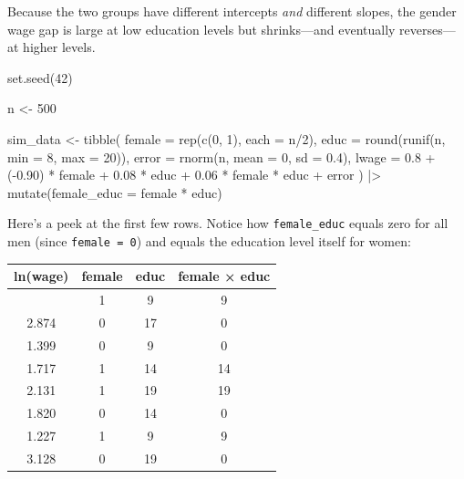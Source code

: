 \documentclass[
  letterpaper,
  DIV=11,
  numbers=noendperiod]{scrreprt}
\newenvironment{Shaded}{\begin{snugshade}}{\end{snugshade}}
\newcommand{\AttributeTok}[1]{\textcolor[rgb]{0.40,0.45,0.13}{#1}}
\newcommand{\DecValTok}[1]{\textcolor[rgb]{0.68,0.00,0.00}{#1}}
\newcommand{\FloatTok}[1]{\textcolor[rgb]{0.68,0.00,0.00}{#1}}
\newcommand{\FunctionTok}[1]{\textcolor[rgb]{0.28,0.35,0.67}{#1}}
\newcommand{\NormalTok}[1]{\textcolor[rgb]{0.00,0.23,0.31}{#1}}
\newcommand{\OtherTok}[1]{\textcolor[rgb]{0.00,0.23,0.31}{#1}}
\newcommand{\SpecialCharTok}[1]{\textcolor[rgb]{0.37,0.37,0.37}{#1}}
\newcounter{none} %
\begin{document}
Because the two groups have different intercepts \emph{and} different
slopes, the gender wage gap is large at low education levels but
shrinks---and eventually reverses---at higher levels.

\begin{Shaded}
\begin{Highlighting}[]
\FunctionTok{set.seed}\NormalTok{(}\DecValTok{42}\NormalTok{)}

\NormalTok{n }\OtherTok{\textless{}{-}} \DecValTok{500}

\NormalTok{sim\_data }\OtherTok{\textless{}{-}} \FunctionTok{tibble}\NormalTok{(}
    \AttributeTok{female =} \FunctionTok{rep}\NormalTok{(}\FunctionTok{c}\NormalTok{(}\DecValTok{0}\NormalTok{, }\DecValTok{1}\NormalTok{), }\AttributeTok{each =}\NormalTok{ n}\SpecialCharTok{/}\DecValTok{2}\NormalTok{),}
    \AttributeTok{educ =} \FunctionTok{round}\NormalTok{(}\FunctionTok{runif}\NormalTok{(n, }\AttributeTok{min =} \DecValTok{8}\NormalTok{, }\AttributeTok{max =} \DecValTok{20}\NormalTok{)),}
    \AttributeTok{error =} \FunctionTok{rnorm}\NormalTok{(n, }\AttributeTok{mean =} \DecValTok{0}\NormalTok{, }\AttributeTok{sd =} \FloatTok{0.4}\NormalTok{),}
    \AttributeTok{lwage =} \FloatTok{0.8} \SpecialCharTok{+}\NormalTok{ (}\SpecialCharTok{{-}}\FloatTok{0.90}\NormalTok{) }\SpecialCharTok{*}\NormalTok{ female }\SpecialCharTok{+} \FloatTok{0.08} \SpecialCharTok{*}\NormalTok{ educ }\SpecialCharTok{+} \FloatTok{0.06} \SpecialCharTok{*}\NormalTok{ female }\SpecialCharTok{*}\NormalTok{ educ }\SpecialCharTok{+}\NormalTok{ error}
\NormalTok{) }\SpecialCharTok{|\textgreater{}}
    \FunctionTok{mutate}\NormalTok{(}\AttributeTok{female\_educ =}\NormalTok{ female }\SpecialCharTok{*}\NormalTok{ educ)}
\end{Highlighting}
\end{Shaded}

Here's a peek at the first few rows. Notice how \texttt{female\_educ}
equals zero for all men (since \texttt{female\ =\ 0}) and equals the
education level itself for women:

{\def\LTcaptype{none} %
\begin{longtable}[]{@{}cccc@{}}
\toprule\noalign{}
ln(wage) & female & educ & female × educ \\
\midrule\noalign{}
\endhead
\bottomrule\noalign{}
\endlastfoot
1.852 & 1 & 9 & 9 \\
2.874 & 0 & 17 & 0 \\
1.399 & 0 & 9 & 0 \\
1.717 & 1 & 14 & 14 \\
2.131 & 1 & 19 & 19 \\
1.820 & 0 & 14 & 0 \\
1.227 & 1 & 9 & 9 \\
3.128 & 0 & 19 & 0 \\
\end{longtable}
}
\end{document}
